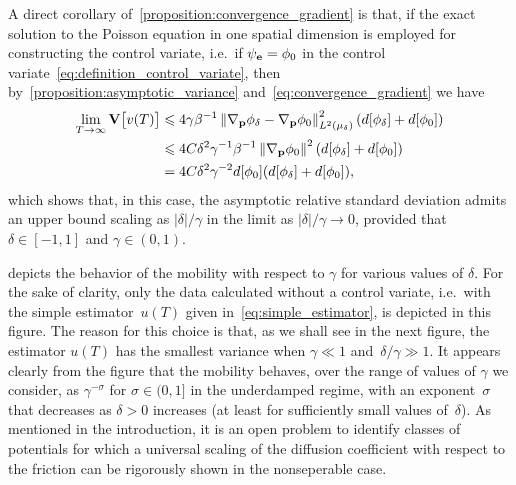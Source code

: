 \documentclass[11pt,a4paper]{article}
\begin{document}
A direct corollary of~\cref{proposition:convergence_gradient} is that,
if the exact solution to the Poisson equation in one spatial dimension is employed for constructing the control variate,
i.e.\ if $\psi_{\boldsymbol{\mathbf e}} = \phi_0$ in the control variate~\eqref{eq:definition_control_variate},
then by~\cref{proposition:asymptotic_variance} and~\eqref{eq:convergence_gradient}
we have
\begin{align*}
    \lim_{T \to \infty} \var \bigl[v(T)\bigr]
    &\leq 4 \gamma \beta^{-1} \norm{\grad_{\vect p} \phi_{\delta} - \grad_{\vect p} \phi_0}[L^2(\mu_{\delta})]^2 (d[\phi_{\delta}] + d[\phi_0]) \\
    &\leq 4 C \delta^2 \gamma^{-1} \beta^{-1} \norm{\grad_{\vect p} \phi_{0}}^2 (d[\phi_{\delta}] + d[\phi_0]) \\
    & = 4 C \delta^2 \gamma^{-2} d[\phi_{0}] (d[\phi_{\delta}] + d[\phi_0]),
\end{align*}
which shows that, in this case,
the asymptotic relative standard deviation admits an upper bound scaling as $\lvert \delta \rvert / \gamma$
in the limit as $\lvert \delta \rvert/\gamma \to 0$,
provided that $\delta \in [-1, 1]$ and $\gamma \in (0, 1)$.

 depicts the behavior of the mobility with respect to $\gamma$ for various values of $\delta$.
For the sake of clarity,
only the data calculated without a control variate,
i.e.\ with the simple estimator~$u(T)$ given in~\eqref{eq:simple_estimator},
is depicted in this figure.
The reason for this choice is that,
as we shall see in the next figure,
the estimator $u(T)$ has the smallest variance when $\gamma \ll 1$ and~$\delta/\gamma \gg 1$.
It appears clearly from the figure that the mobility behaves,
over the range of values of $\gamma$ we consider,
as $\gamma^{-\sigma}$ for $\sigma \in (0, 1]$ in the underdamped regime,
with an exponent~$\sigma$ that decreases as $\delta > 0$ increases (at least for sufficiently small values of~$\delta$). As mentioned in the introduction, it is an open problem to identify classes of potentials for which a universal scaling of the diffusion coefficient with respect to the friction can be rigorously shown in the nonseperable case.
\end{document}
